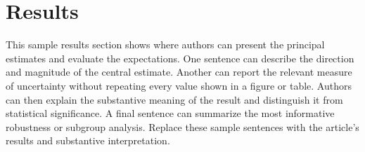 \section{Results} 
\label{sec:results}

This sample results section shows where authors can present the principal estimates and evaluate the expectations. One sentence can describe the direction and magnitude of the central estimate. Another can report the relevant measure of uncertainty without repeating every value shown in a figure or table. Authors can then explain the substantive meaning of the result and distinguish it from statistical significance. A final sentence can summarize the most informative robustness or subgroup analysis. Replace these sample sentences with the article's results and substantive interpretation.

